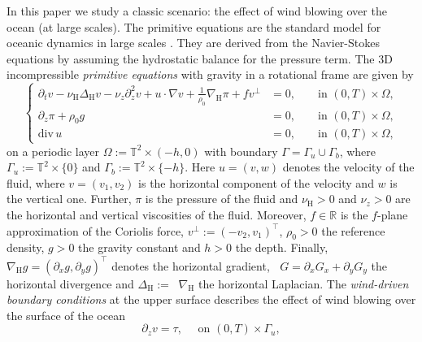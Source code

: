 \documentclass[preprint]{elsarticle}
\numberwithin{equation}{section}
\newcommand {\R}	{\mathbb{R}}
\newcommand {\T}	{\mathbb{T}}
\DeclareMathOperator{\divH}{div_{\H}}
\renewcommand{\H}{\mathrm{H}}
\newcommand{\dk}[1]{\partial_{#1}}
\newcommand{\dz}{\dk{z}}
\newcommand{\nablaH}{\nabla_{\H}}
\newcommand{\DeltaH}{\Delta_{\H}}
\newcommand{\rH}{\H}
\renewcommand{\div}{\mathrm{div} \,}
\begin{document}
In this paper we study a classic scenario: the effect of wind blowing over the ocean (at large scales). 
The primitive equations are the standard model for oceanic
dynamics in large scales \cite{Ped:87_2,LTW:92b_2}. They are derived from the Navier-Stokes equations by assuming the hydrostatic balance for the pressure term.
The 3D incompressible \emph{primitive equations} with gravity in a rotational frame are given by
\begin{equation}
	\left\{
	\begin{aligned}
		\partial_t v - \nu_{\rH} \DeltaH v - \nu_z \partial_z^2 v + u \cdot \nabla v + \frac{1}{\rho_0}\nablaH \pi + f v^\perp &= 0, &&\text{ in } (0,T) \times \Omega, \\
		\partial_z \pi + \rho_0 g &= 0, &&\text{ in } (0,T) \times \Omega, \\
		\div u &= 0, &&\text{ in } (0,T) \times \Omega ,
	\end{aligned}
	\right. 
	\tag{PE}
	\label{eq:pe_2}
\end{equation}
on a periodic layer $\Omega := \T^2 \times (-h,0)$ with boundary $\Gamma = \Gamma_u \cup \Gamma_b$, where $\Gamma_u := \T^2 \times \{ 0 \}$ and $\Gamma_b := \T^2 \times \{ -h \}$.
Here $u = (v,w)$ denotes the velocity of the fluid, where $v = (v_1,v_2)$ is the horizontal component of the velocity and $w$ is the vertical one. Further, $\pi$ is the pressure of the fluid and $\nu_{\rH} > 0$ and $\nu_z > 0$ are the horizontal and vertical viscosities of the fluid. 
Moreover, $f \in \R$ is the $f$-plane approximation of the Coriolis force, $v^\perp := (-v_2,v_1)^\top$, $\rho_0>0$ the reference density, $g > 0$ the gravity constant and $h>0$ the depth.
Finally, $\nablaH g= (\partial_x g,\partial_y g)^\top$ denotes the horizontal gradient, $\divH G = \partial_x G_x + \partial_y G_y$ the horizontal divergence and $\DeltaH := \divH \nablaH$ the horizontal Laplacian. 
The \emph{wind-driven boundary conditions} at the upper surface describes the effect of wind blowing over the surface of the ocean
\begin{equation}
	\dz v = \tau, \quad \text{ on } (0,T) \times \Gamma_u, %
	\label{eq:wind bc_2}
\end{equation} 
\end{document}
